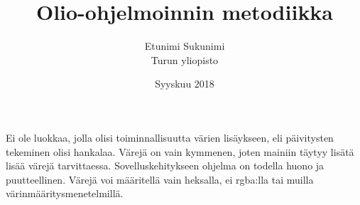 \documentclass[a4paper,12pt,titlepage]{article}
\title{Olio-ohjelmoinnin metodiikka}
\author{Etunimi Sukunimi\\[1cm]
 Turun yliopisto}
\date{Syyskuu 2018}
\theoremstyle{definition}
\theoremstyle{remark}
\begin{document}
\maketitle          %
\tableofcontents    %


\section{}

Ei ole luokkaa, jolla olisi toiminnallisuutta värien lisäykseen, eli päivitysten tekeminen olisi hankalaa. Värejä on vain kymmenen, joten mainiin täytyy lisätä lisää värejä tarvittaessa. Sovelluskehitykseen ohjelma on todella huono ja puutteellinen. Värejä voi määritellä vain heksalla, ei rgba:lla tai muilla värinmääritysmenetelmillä. 


\renewcommand{\refname}{Kirjallisuutta} %

\begin{thebibliography}{99}
\bibitem{} 
\end{thebibliography}
\end{document}
